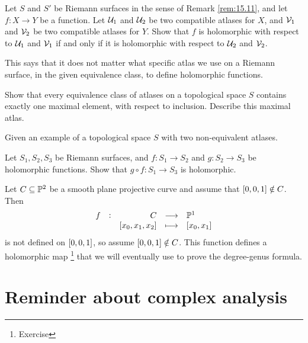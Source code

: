 \begin{exercise**}
Let $ S $ and $ S' $ be Riemann surfaces in the sense of Remark \ref{rem:15.11}, and let $ f : X \to Y $ be a function. Let $ \mathcal{U}_1 $ and $ \mathcal{U}_2 $ be two compatible atlases for $ X $, and $ \mathcal{V}_1 $ and $ \mathcal{V}_2 $ be two compatible atlases for $ Y $. Show that $ f $ is holomorphic with respect to $ \mathcal{U}_1 $ and $ \mathcal{V}_1 $ if and only if it is holomorphic with respect to $ \mathcal{U}_2 $ and $ \mathcal{V}_2 $.
\end{exercise**}

This says that it does not matter what specific atlas we use on a Riemann surface, in the given equivalence class, to define holomorphic functions.

\begin{exercise**}
Show that every equivalence class of atlases on a topological space $ S $ contains exactly one maximal element, with respect to inclusion. Describe this maximal atlas.
\end{exercise**}

\begin{exercise**}
Given an example of a topological space $ S $ with two non-equivalent atlases.
\end{exercise**}

\begin{exercise**}
Let $ S_1, S_2, S_3 $ be Riemann surfaces, and $ f : S_1 \to S_2 $ and $ g : S_2 \to S_3 $ be holomorphic functions. Show that $ g \circ f : S_1 \to S_3 $ is holomorphic.
\end{exercise**}

\begin{example}
\label{eg:15.12}
Let $ C \subseteq \mathbb{P}^2 $ be a smooth plane projective curve and assume that $ \sbr{0, 0, 1} \notin C $. Then
$$ \function[f]{C}{\PP^1}{\sbr{x_0, x_1, x_2}}{\sbr{x_0, x_1}} $$
is not defined on $ \sbr{0, 0, 1} $, so assume $ \sbr{0, 0, 1} \notin C $. This function defines a holomorphic map \footnote{Exercise} that we will eventually use to prove the degree-genus formula.
\end{example}

\pagebreak

\section{Reminder about complex analysis}

